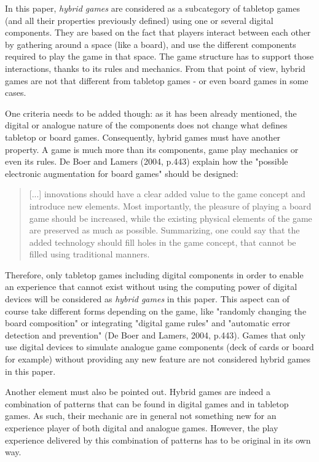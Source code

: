 In this paper, \textit{hybrid games} are considered as a subcategory of tabletop games (and all their properties previously defined) using one or several digital components. They are based on the fact that players interact between each other by gathering around a space (like a board), and use the different components required to play the game in that space. The game structure has to support those interactions, thanks to its rules and mechanics. From that point of view, hybrid games are not that different from tabletop games - or even board games in some cases.

One criteria needs to be added though: as it has been already mentioned, the digital or analogue nature of the components does not change what defines tabletop or board games. Consequently, hybrid games must have another property. A game is much more than its components, game play mechanics or even its rules. De Boer and Lamers (2004, p.443)\cite{chap:aug} explain how the "possible electronic augmentation for board games" should be designed:

\begin{quotation}
[...] innovations should have a clear added value to the game concept and introduce new elements. Most importantly, the pleasure of playing a board game should be increased, while the existing physical elements of the game are preserved as much as possible. Summarizing, one could say that the added technology should fill holes in the game concept, that cannot be filled using traditional manners.
\end{quotation}

Therefore, only tabletop games including digital components in order to enable an experience that cannot exist without using the computing power of digital devices will be considered as \textit{hybrid games} in this paper. This aspect can of course take different forms depending on the game, like "randomly changing the board composition" or integrating "digital game rules" and "automatic error detection and prevention" (De Boer and Lamers, 2004, p.443)\cite{chap:aug}. Games that only use digital devices to simulate analogue game components (deck of cards or board for example) without providing any new feature are not considered hybrid games in this paper.

Another element must also be pointed out. Hybrid games are indeed a combination of patterns that can be found in digital games and in tabletop games. As such, their mechanic are in general not something new for an experience player of both digital and analogue games. However, the play experience delivered by this combination of patterns has to be original in its own way.
